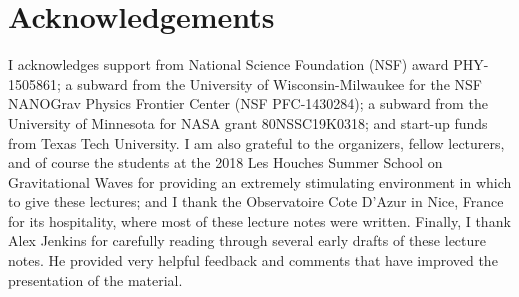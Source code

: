 \section*{Acknowledgements}
\label{s:acknowledgements}

I acknowledges support from National Science Foundation (NSF)
award PHY-1505861; a subward from the University of Wisconsin-Milwaukee
for the NSF NANOGrav Physics Frontier Center (NSF PFC-1430284); 
a subward from the University of Minnesota for NASA grant 80NSSC19K0318; 
and start-up funds from Texas Tech University.
I am also grateful to the organizers, fellow lecturers, and of course
the students at the 2018 Les Houches Summer School on Gravitational 
Waves for providing an extremely stimulating environment in which to 
give these lectures; and I thank the Observatoire Cote D'Azur in Nice, 
France for its hospitality, where most of these lecture notes were written.
Finally, I thank Alex Jenkins for carefully reading through several
early drafts of these lecture notes.
He provided very helpful feedback and comments that have improved 
the presentation of the material.
 

